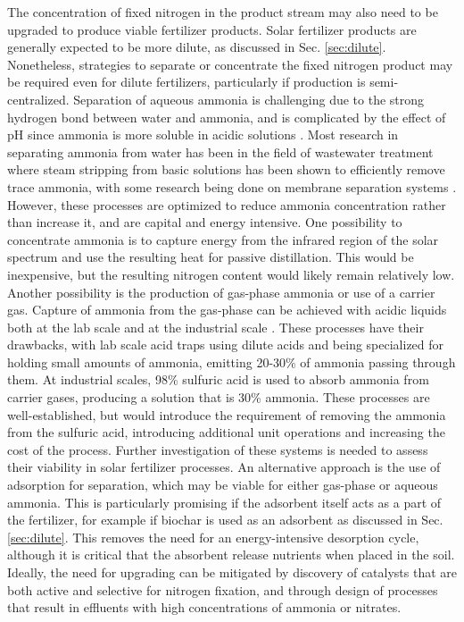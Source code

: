 The concentration of fixed nitrogen in the product stream may also need to be upgraded to produce viable fertilizer products. Solar fertilizer products are generally expected to be more dilute, as discussed in Sec. \ref{sec:dilute}. Nonetheless, strategies to separate or concentrate the fixed nitrogen product may be required even for dilute fertilizers, particularly if production is semi-centralized. Separation of aqueous ammonia is challenging due to the strong hydrogen bond between water and ammonia, and is complicated by the effect of pH since ammonia is more soluble in acidic solutions \cite{Ndegwa_2009}. Most research in separating ammonia from water has been in the field of wastewater treatment where steam stripping from basic solutions has been shown to efficiently remove trace ammonia, with some research being done on membrane separation systems \cite{Yin_2018, Kinidi_2018, Hasano_lu_2010}. However, these processes are optimized to reduce ammonia concentration rather than increase it, and are capital and energy intensive. One possibility to concentrate ammonia is to capture energy from the infrared region of the solar spectrum and use the resulting heat for passive distillation. This would be inexpensive, but the resulting nitrogen content would likely remain relatively low. Another possibility is the production of gas-phase ammonia or use of a carrier gas. Capture of ammonia from the gas-phase can be achieved with acidic liquids both at the lab scale \cite{Ndegwa_2009} and at the industrial scale \cite{Kinidi_2018}. These processes have their drawbacks, with lab scale acid traps using dilute acids and being specialized for holding small amounts of ammonia, emitting 20-30\% of ammonia passing through them\cite{Ndegwa_2009}. At industrial scales, 98\% sulfuric acid is used to absorb ammonia from carrier gases, producing a solution that is 30\% ammonia. These processes are well-established, but would introduce the requirement of removing the ammonia from the sulfuric acid, introducing additional unit operations and increasing the cost of the process. \cite{Kinidi_2018} Further investigation of these systems is needed to assess their viability in solar fertilizer processes. An alternative approach is the use of adsorption for separation, which may be viable for either gas-phase or aqueous ammonia. This is particularly promising if the adsorbent itself acts as a part of the fertilizer, for example if biochar is used as an adsorbent as discussed in Sec. \ref{sec:dilute}. This removes the need for an energy-intensive desorption cycle, although it is critical that the absorbent release nutrients when placed in the soil. Ideally, the need for upgrading can be mitigated by discovery of catalysts that are both active and selective for nitrogen fixation, and through design of processes that result in effluents with high concentrations of ammonia or nitrates. 

